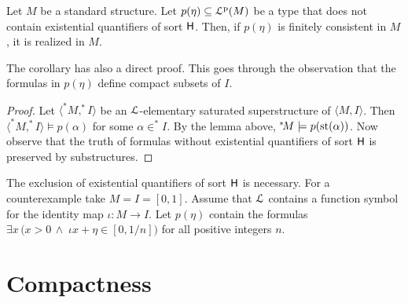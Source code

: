 \documentclass[10pt,oneside]{amsproc}
\begin{document}
\begin{corollary}\label{corol_st}
  Let $M$ be a standard structure.
  Let $p(\eta)\subseteq{\EuScript L}^{\rm p}(M)$ be a type that does not contain existential quantifiers of sort ${\sf H}$.
  Then, if $p(\eta)$ is finitely consistent in $M$, it is realized in $M$.
 \end{corollary}
 
 The corollary has also a direct proof.
 This goes through the observation that the formulas in $p(\eta)$ define compact subsets of $I$.

 \begin{proof}
  Let $\langle ^*\!M,^*\!\!I\rangle$ be an ${\EuScript L}$-elementary saturated superstructure of $\langle M,I\rangle$.
  Then $\langle ^*\!M,^*\!\!I\rangle\models p(\alpha)$ for some $\alpha\in ^*\!\!I$.
  By the lemma above, $^*\!M\models p({\rm st}(\alpha))$.
  Now observe that the truth of formulas without  existential quantifiers of sort ${\sf H}$ is preserved by substructures.
 \end{proof}
 
 The exclusion of existential quantifiers of sort ${\sf H}$ is necessary.
 For a counterexample take $M=I=[0,1]$.
 Assume that ${\EuScript L}$ contains a function symbol for the identity map $\iota:M\to I$.
 Let $p(\eta)$ contain the formulas $\exists x\,\big(x>0\,\wedge\;\iota x+\eta\in[0,1/n]\big)$ for all positive integers $n$.



\section{Compactness}\label{compactness}
\end{document}
